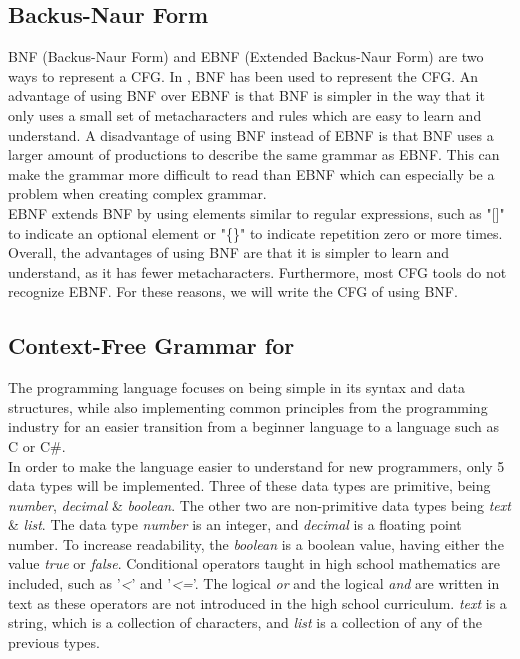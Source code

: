 \subsection{Backus-Naur Form}
BNF (Backus-Naur Form) and EBNF (Extended Backus-Naur Form) are two ways to represent a CFG\cite{SPO_Topic_5}. In \lang, BNF has been used to represent the CFG. An advantage of using BNF over EBNF is that BNF is simpler in the way that it only uses a small set of metacharacters\cite{IBM} and rules which are easy to learn and understand. A disadvantage of using BNF instead of EBNF is that BNF uses a larger amount of productions to describe the same grammar as EBNF. This can make the grammar more difficult to read than EBNF which can especially be a problem when creating complex grammar.\\ 
EBNF extends BNF by using elements similar to regular expressions, such as "[]" to indicate an optional element or "\{\}" to indicate repetition zero or more times\cite{SPO_Topic_5}.\\
Overall, the advantages of using BNF are that it is simpler to learn and understand, as it has fewer metacharacters. Furthermore, most CFG tools do not recognize EBNF. For these reasons, we will write the CFG of \lang using BNF.

\subsection{Context-Free Grammar for \lang} \label{CFGForLang}
The \lang programming language focuses on being simple in its syntax and data structures, while also implementing common principles from the programming industry for an easier transition from a beginner language to a language such as C or C\#.\\

In order to make the language easier to understand for new programmers, only 5 data types will be implemented. Three of these data types are primitive, being \textit{number}, \textit{decimal} \& \textit{boolean}. The other two are non-primitive data types being \textit{text} \& \textit{list}. The data type \textit{number} is an integer, and \textit{decimal} is a floating point number. To increase readability, the \textit{boolean} is a boolean value, having either the value \textit{true} or \textit{false}. Conditional operators taught in high school mathematics are included, such as '\textit{<}' and '\textit{<=}'. The logical \textit{or} and the logical \textit{and} are written in text as these operators are not introduced in the high school curriculum. \textit{text} is a string, which is a collection of characters, and \textit{list} is a collection of any of the previous types. \\

